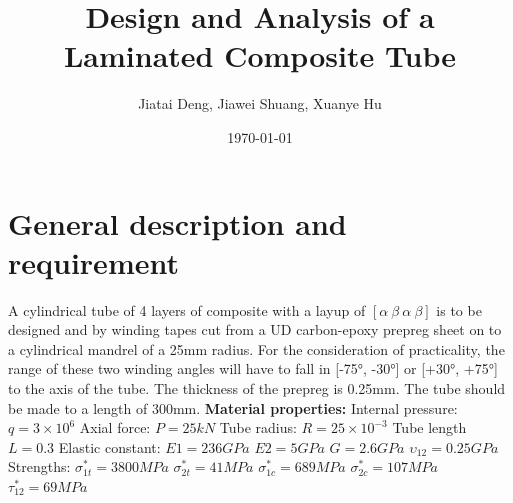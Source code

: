 \documentclass[12pt]{article}
\title{\huge Design and Analysis of a Laminated Composite Tube}
\author{Jiatai Deng, Jiawei Shuang, Xuanye Hu}
\affil{Department of Mechanical, Aerospace and Civil Engineering}
\date{\today}
\begin{document}
\newpage
\maketitle
\thispagestyle{empty}
\newpage
\tableofcontents
\thispagestyle{empty} 
\newpage

\section{General description and requirement}
\setcounter{page}{1}
\onehalfspacing
\noindent A cylindrical tube of 4 layers of composite with a layup of 
$\left[\alpha\  \beta\  \alpha\  \beta\right]$
is to be designed and by winding tapes cut from a UD carbon-epoxy prepreg sheet on to a cylindrical mandrel of a 25mm radius. For the consideration of practicality, the range of these two winding angles will have to fall in [-75°, -30°] or [+30°, +75°] to the axis of the tube. The thickness of the prepreg is 0.25mm. The tube should be made to a length of 300mm.  \newline
\noindent \textbf{Material properties:}\newline
Internal pressure: $q = 3\times10^{6}$ \qquad Axial force: $P = 25 kN$ \newline
Tube radius: $R = 25\times10^{-3}$ \qquad  Tube length $L = 0.3$ \newline
Elastic constant: $E1 = 236 GPa$ \qquad $E2 = 5 GPa$ \qquad $G = 2.6 GPa$ \qquad $\upsilon_{12} = 0.25 GPa$ \newline
Strengths: $\sigma_{1t}^{*} = 3800 MPa$ \qquad $\sigma_{2t}^{*} = 41 MPa$ \qquad $\sigma_{1c}^{*} = 689 MPa$ \qquad $\sigma_{2c}^{*} = 107 MPa$\qquad\qquad\qquad $\tau _{12}^{*} = 69 MPa$ 
\end{document}
